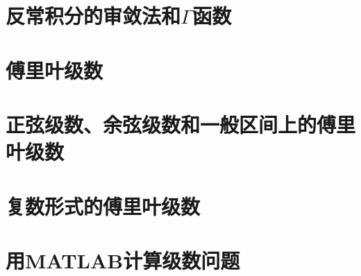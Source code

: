 \section{反常积分的审敛法和$\Gamma$函数}

\section{傅里叶级数}

\section{正弦级数、余弦级数和一般区间上的傅里叶级数}

\section{复数形式的傅里叶级数}

\section{用MATLAB计算级数问题}



